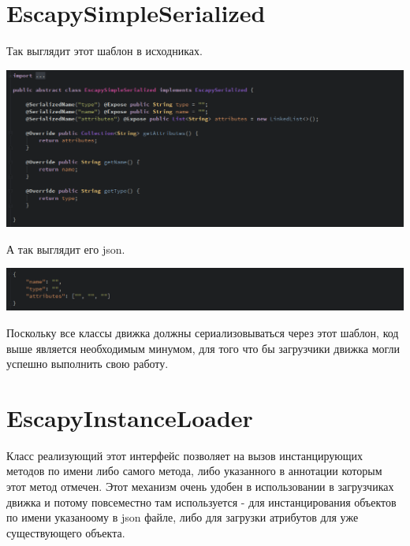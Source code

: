 \documentclass[11pt]{report}
\begin{document}
\section{EscapySimpleSerialized}
Так выглядит этот шаблон в исходниках.
\begin{center}
	\includegraphics[width=1.2\linewidth]{img/5.png} 
  	\label{img:5} 
\end{center}	
А так выглядит его json.	
\begin{center}
	\includegraphics[width=1.2\linewidth]{img/6.png} 
  	\label{img:6} 
\end{center}
Поскольку все классы движка должны сериализовываться через этот шаблон, код выше является необходимым минумом, для того что бы загрузчики движка могли успешно выполнить свою работу.
\newpage
\section{EscapyInstanceLoader}
Класс реализующий этот интерфейс позволяет на вызов инстанцирующих методов по имени либо самого метода, либо указанного в аннотации которым этот метод отмечен. Этот механизм очень удобен в использовании в загрузчиках движка и потому повсеместно там используется - для инстанцирования объектов по имени указаноому в json файле, либо для загрузки атрибутов для уже существующего объекта. 
\end{document}
